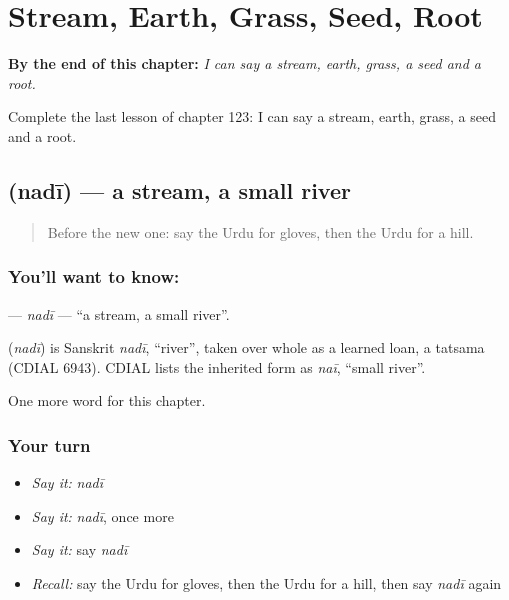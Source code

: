 
\chapter{Stream, Earth, Grass, Seed, Root}
\label{ch:ur-stream-earth-grass-seed-root}

\begin{chapteropening}
\textbf{By the end of this chapter:} \emph{I can say a stream, earth, grass, a seed and a root.}

Complete the last lesson of chapter 123: I can say a stream, earth, grass, a seed and a root.
\end{chapteropening}

\section[\texorpdfstring{\ur{ندی} (nadī)}{ندی (nadī)}]{ (nadī) — a stream, a small river}

\label{lesson:UR-C123-nadi}



\begin{quote}
Before the new one: say the Urdu for gloves, then the Urdu for a hill.
\end{quote}

\subsection*{You'll want to know: }
\textbf{} — \emph{nadī} — \textquotedblleft{}a stream, a small river\textquotedblright{}.

\begin{cousinweb}
\textbf{} (\emph{nadī}) is Sanskrit \emph{nadī}, \textquotedblleft{}river\textquotedblright{}, taken over whole as a learned loan, a tatsama (CDIAL 6943). CDIAL lists the inherited form as \emph{naī}, \textquotedblleft{}small river\textquotedblright{}.
\end{cousinweb}

\begin{grammarlens}[title={What you've built}]
One more word for this chapter.
\end{grammarlens}

\subsection*{Your turn}
\begin{itemize}
\raggedright
  \item \emph{Say it:} \emph{nadī}
  \item \emph{Say it:} \emph{nadī}, once more
  \item \emph{Say it:} say \emph{nadī}
  \item \emph{Recall:} say the Urdu for gloves, then the Urdu for a hill, then say \emph{nadī} again
\end{itemize}

